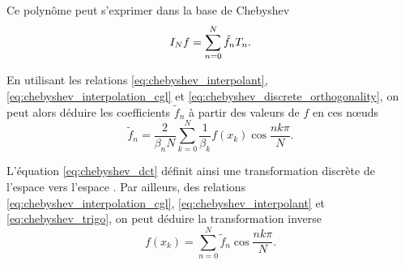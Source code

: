 Ce polynôme peut s'exprimer dans la base de Chebyshev
\begin{equation}
	\interpolant{f}{N} = \sum_{n=0}^{N} \tilde{f}_n T_n.
	\label{eq:chebyshev_interpolant}
\end{equation}

En utilisant les relations \eqref{eq:chebyshev_interpolant}, \eqref{eq:chebyshev_interpolation_cgl} et \eqref{eq:chebyshev_discrete_orthogonality}, on peut alors déduire les coefficients $\tilde{f}_n$ à partir des valeurs de $f$ en ces n\oe uds%
\begin{equation}
	\tilde{f}_n = \frac{2}{\beta_n N} \sum_{k=0}^{N} \frac{1}{\beta_k} f(x_k) \cos \frac{n k \pi}{N}.
	\label{eq:chebyshev_dct}
\end{equation}

L'équation \eqref{eq:chebyshev_dct} définit ainsi une transformation discrète de l'espace  vers l'espace . 
Par ailleurs, des relations \eqref{eq:chebyshev_interpolation_cgl}, \eqref{eq:chebyshev_interpolant} et \eqref{eq:chebyshev_trigo}, on peut déduire la transformation inverse
\begin{equation}
	f(x_k) = \sum_{n=0}^{N} \tilde{f}_n \cos \frac{n k \pi}{N}.
	\label{eq:chebyshev_idct}
\end{equation}

